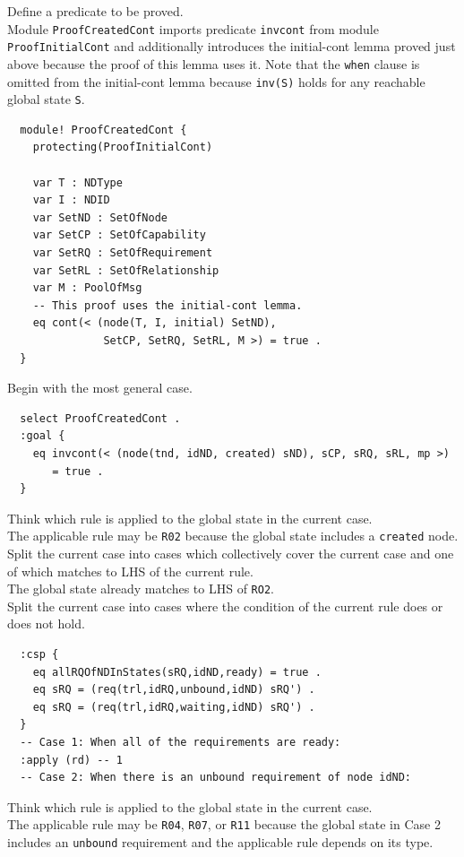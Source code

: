 \documentclass[12pt]{report}
\newcommand{\stt}[1]{{\small{\tt {#1}}}}
\begin{document}
 Define a predicate to be proved.\\
Module {\tt ProofCreatedCont} imports predicate {\tt invcont} from
module {\tt ProofInitialCont} and additionally introduces the
initial-cont lemma proved just above because the proof of this lemma
uses it. Note that the {\tt when} clause is omitted from the
initial-cont lemma because \stt{inv(S)} holds for any reachable global
state {\tt S}.
\small
\begin{verbatim}
  module! ProofCreatedCont {
    protecting(ProofInitialCont)

    var T : NDType
    var I : NDID
    var SetND : SetOfNode
    var SetCP : SetOfCapability
    var SetRQ : SetOfRequirement
    var SetRL : SetOfRelationship
    var M : PoolOfMsg
    -- This proof uses the initial-cont lemma.
    eq cont(< (node(T, I, initial) SetND), 
               SetCP, SetRQ, SetRL, M >) = true .
  }
\end{verbatim}
\normalsize
 Begin with the most general case.
\small
\begin{verbatim}
  select ProofCreatedCont .
  :goal {
    eq invcont(< (node(tnd, idND, created) sND), sCP, sRQ, sRL, mp >)
       = true .
  }
\end{verbatim}
\normalsize
 Think which rule is applied to the 
global state in the current case. \\
The applicable rule may be {\tt R02} because the global state includes
a {\tt created} node.\\

 Split the current case into cases which
collectively cover the current case and one of which matches to LHS of
the current rule. \\ 
The global state already matches to LHS of {\tt RO2}.\\

 Split the current case into cases where
the condition of the current rule does or does not hold.
\small
\begin{verbatim}
  :csp { 
    eq allRQOfNDInStates(sRQ,idND,ready) = true .
    eq sRQ = (req(trl,idRQ,unbound,idND) sRQ') .
    eq sRQ = (req(trl,idRQ,waiting,idND) sRQ') .
  }
  -- Case 1: When all of the requirements are ready:
  :apply (rd) -- 1
  -- Case 2: When there is an unbound requirement of node idND:
\end{verbatim}
\normalsize
 Think which rule is applied to the 
global state in the current case. \\
The applicable rule may be {\tt R04}, {\tt R07}, or {\tt R11} because
the global state in Case 2 includes an {\tt unbound} requirement and
the applicable rule depends on its type.\\
\end{document}
